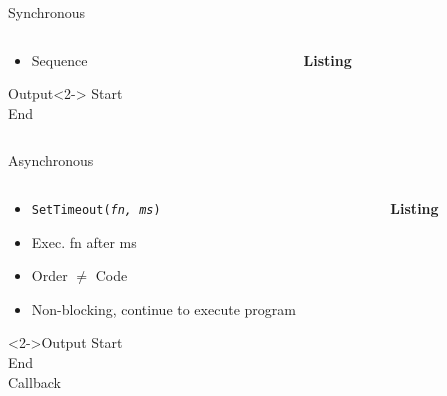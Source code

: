 \documentclass[pdf,table]{beamer}
\begin{document}
\begin{frame}{Synchronous}
	\begin{columns}[T]
		\begin{column}{0.48\textwidth}
			\begin{itemize}
				\item Sequence
			\end{itemize}
			\begin{block}{Output}<2->
				Start \\ End
			\end{block}
		\end{column}
		\begin{column}{0.48\textwidth}
			{\bf Listing}
			
		\end{column}
	\end{columns}	
\end{frame}

\begin{frame}{Asynchronous}%
	\begin{columns}[T]
		\begin{column}{0.38\textwidth}
			\begin{itemize}
				\item {\tt SetTimeout({\it fn, ms})}
				\item Exec. fn after ms
				\item Order $\ne$ Code
				\item Non-blocking, continue to execute program
			\end{itemize}
			\begin{block}<2->{Output}
				Start \\ End \\ Callback
			\end{block}
		\end{column}
		\begin{column}{0.58\textwidth}
			{\bf Listing}
			
		\end{column}
	\end{columns}	
\end{frame}
\end{document}
